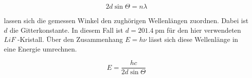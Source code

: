 \begin{equation}
  2 d \sin{\Theta} = n \lambda
  \label{eqn:bragg}
\end{equation}

lassen sich die gemessen Winkel den zughörigen Wellenlängen zuordnen. Dabei ist $d$ die
Gitterkonstante. In diesem Fall ist $d = \SI{201.4}{\pico\meter}$ für den hier verwendeten
$LiF$ -Kristall. Über den Zusammenhang $E=h\nu$ lässt sich diese Wellenlänge in eine
Energie umrechnen.

\begin{equation}
  E = \dfrac{hc}{2d\sin{\Theta}}
  \label{eqn:E}
\end{equation}
